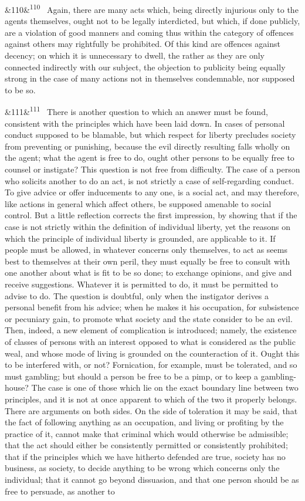 \documentclass[12pt]{article}
\newcommand{\para}[1][]{\par\noindent\ifx&#1&\else\textsuperscript{\footnotesize #1}~\fi}
\begin{document}
\para[110] Again, there are many acts which, being directly injurious only to the agents themselves, ought not to be legally interdicted, but which, if done publicly, are a violation of good manners and coming thus within the category of offences against others may rightfully be prohibited. Of this kind are offences against decency; on which it is unnecessary to dwell, the rather as they are only connected indirectly with our subject, the objection to publicity being equally strong in the case of many actions not in themselves condemnable, nor supposed to be so.

\para[111] There is another question to which an answer must be found, consistent with the principles which have been laid down. In cases of personal conduct supposed to be blamable, but which respect for liberty precludes society from preventing or punishing, because the evil directly resulting falls wholly on the agent; what the agent is free to do, ought other persons to be equally free to counsel or instigate? This question is not free from difficulty. The case of a person who solicits another to do an act, is not strictly a case of self-regarding conduct. To give advice or offer inducements to any one, is a social act, and may therefore, like actions in general which affect others, be supposed amenable to social control. But a little reflection corrects the first impression, by showing that if the case is not strictly within the definition of individual liberty, yet the reasons on which the principle of individual liberty is grounded, are applicable to it. If people must be allowed, in whatever concerns only themselves, to act as seems best to themselves at their own peril, they must equally be free to consult with one another about what is fit to be so done; to exchange opinions, and give and receive suggestions. Whatever it is permitted to do, it must be permitted to advise to do. The question is doubtful, only when the instigator derives a personal benefit from his advice; when he makes it his occupation, for subsistence or pecuniary gain, to promote what society and the state consider to be an evil. Then, indeed, a new element of complication is introduced; namely, the existence of classes of persons with an interest opposed to what is considered as the public weal, and whose mode of living is grounded on the counteraction of it. Ought this to be interfered with, or not? Fornication, for example, must be tolerated, and so must gambling; but should a person be free to be a pimp, or to keep a gambling-house? The case is one of those which lie on the exact boundary line between two principles, and it is not at once apparent to which of the two it properly belongs. There are arguments on both sides. On the side of toleration it may be said, that the fact of following anything as an occupation, and living or profiting by the practice of it, cannot make that criminal which would otherwise be admissible; that the act should either be consistently permitted or consistently prohibited; that if the principles which we have hitherto defended are true, society has no business, as society, to decide anything to be wrong which concerns only the individual; that it cannot go beyond dissuasion, and that one person should be as free to persuade, as another to 
\end{document}
